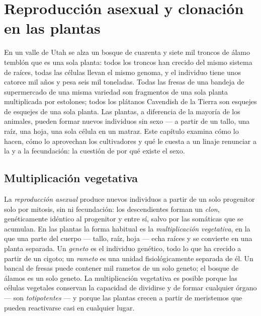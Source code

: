 \chapter{Reproducción asexual y clonación en las plantas}\label{ch:b2:asexual-reproduction}

En un valle de Utah se alza un bosque de cuarenta y siete mil troncos de
álamo temblón que es una sola planta: todos los troncos han crecido del
mismo sistema de raíces, todas las células llevan el mismo genoma, y el
individuo tiene unos catorce mil años y pesa seis mil toneladas. Todas
las fresas de una bandeja de supermercado de una misma variedad son
fragmentos de una sola planta multiplicada por estolones; todos los
plátanos Cavendish de la Tierra son esquejes de esquejes de una sola
planta. Las plantas, a diferencia de la mayoría de los animales, pueden
formar nuevos individuos sin sexo --- a partir de un tallo, una raíz,
una hoja, una sola célula en un matraz. Este capítulo examina cómo lo
hacen, cómo lo aprovechan los cultivadores y qué le cuesta a un linaje
renunciar a la  y a la fecundación: la cuestión de por qué existe
el sexo.

\section{Multiplicación vegetativa}

\begin{definition}\label{def:b2:asexual-reproduction:clone}
La \emph{reproducción asexual} produce nuevos individuos a partir de un
solo progenitor solo por mitosis, sin  ni fecundación: los
descendientes forman un \emph{clon}, genéticamente idéntico al
progenitor y entre sí, salvo por las  somáticas que se
acumulan. En las plantas la forma habitual es la \emph{multiplicación
vegetativa}, en la que una parte del cuerpo --- tallo, raíz, hoja ---
echa raíces y se convierte en una planta separada. Un \emph{geneto} es el
individuo genético, todo lo que ha crecido a partir de un cigoto; un
\emph{rameto} es una unidad fisiológicamente separada de él. Un bancal de
fresas puede contener mil rametos de un solo geneto; el bosque de álamos
es un solo geneto. La multiplicación vegetativa es posible porque las
células vegetales conservan la capacidad de dividirse y de formar
cualquier órgano --- son \emph{totipotentes} --- y porque las plantas
crecen a partir de meristemos que pueden reactivarse casi en cualquier
lugar.
\end{definition}

